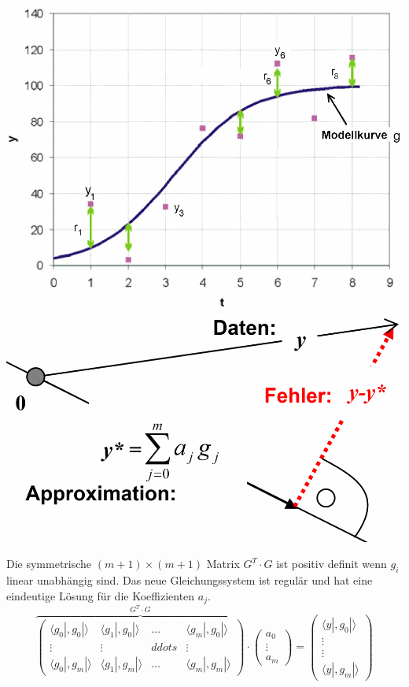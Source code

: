 \begin{minipage}[c]{6.5cm}
\includegraphics[width=\textwidth]{bilder/leastSquare}\\

\includegraphics[width=1\textwidth,trim=-3cm 0cm 0cm 0cm]{bilder/leastSquareOrth}
\end{minipage}

Die symmetrische $(m+1)\times(m+1)$ Matrix $G^T \cdot G$ ist positiv definit wenn $g_i$ linear unabhängig sind.
Das neue Gleichungssystem ist regulär und hat eine eindeutige Lösung für die Koeffizienten $a_j$.
\[
    \overbrace{
    \begin{pmatrix}
        \langle g_0|,g_0|\rangle & \langle g_1|,g_0|\rangle & \ldots & \langle g_m|,g_0|\rangle \\
        \vdots & \vdots & ddots & \vdots \\
        \langle g_0|,g_m|\rangle & \langle g_1|,g_m|\rangle & \ldots & \langle g_m|,g_m|\rangle
    \end{pmatrix}
    }^{G^T \cdot G}
    \cdot
    \begin{pmatrix}
        a_0 \\ \vdots \\ a_m
    \end{pmatrix}
    =
    \begin{pmatrix}
        \langle y|,g_0 |\rangle \\ \vdots \\ \vdots \\ \langle y|,g_m| \rangle
    \end{pmatrix}
\]

